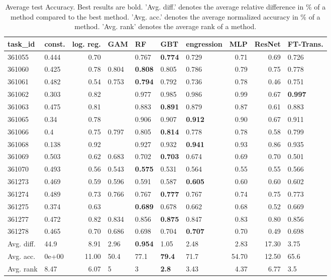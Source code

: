 \begin{table}[ht!]
\centering
\begingroup\footnotesize
\begin{tabular}{llrllllrrl}
  \hline
\hline
task\_id & const. & log. reg. & GAM & RF & GBT & engression & MLP & ResNet & FT-Trans. \\ 
  \hline
361055 & 0.444 & 0.70 &  & 0.767 & \textbf{0.774} & 0.729 & 0.71 & 0.69 & 0.726 \\ 
  361060 & 0.425 & 0.78 & 0.804 & \textbf{0.808} & 0.805 & 0.786 & 0.79 & 0.75 & 0.778 \\ 
  361061 & 0.482 & 0.54 & 0.753 & \textbf{0.794} & 0.792 & 0.736 & 0.78 & 0.46 & 0.751 \\ 
  361062 & 0.303 & 0.82 &  & 0.977 & 0.985 & 0.986 & 0.99 & 0.67 & \textbf{0.997} \\ 
  361063 & 0.475 & 0.81 &  & 0.883 & \textbf{0.891} & 0.879 & 0.87 & 0.61 & 0.883 \\ 
  361065 & 0.34 & 0.78 &  & 0.906 & 0.907 & \textbf{0.912} & 0.90 & 0.67 & 0.911 \\ 
  361066 & 0.4 & 0.75 & 0.797 & 0.805 & \textbf{0.814} & 0.778 & 0.78 & 0.58 & 0.799 \\ 
  361068 & 0.138 & 0.92 &  & 0.927 & 0.932 & \textbf{0.941} & 0.93 & 0.86 & 0.935 \\ 
  361069 & 0.503 & 0.62 & 0.683 & 0.702 & \textbf{0.703} & 0.674 & 0.69 & 0.70 & 0.501 \\ 
  361070 & 0.493 & 0.56 & 0.543 & \textbf{0.575} & 0.531 & 0.564 & 0.55 & 0.55 & 0.566 \\ 
  361273 & 0.469 & 0.59 & 0.596 & 0.591 & 0.587 & \textbf{0.605} & 0.60 & 0.60 & 0.602 \\ 
  361274 & 0.489 & 0.73 & 0.766 & 0.767 & \textbf{0.777} & 0.767 & 0.74 & 0.75 & 0.773 \\ 
  361275 & 0.374 & 0.63 &  & \textbf{0.689} & 0.678 & 0.662 & 0.68 & 0.52 & 0.669 \\ 
  361277 & 0.472 & 0.82 & 0.834 & 0.856 & \textbf{0.875} & 0.847 & 0.83 & 0.80 & 0.856 \\ 
  361278 & 0.465 & 0.70 & 0.686 & 0.698 & 0.704 & \textbf{0.707} & 0.70 & 0.49 & 0.698 \\ 
   \hline
Avg. diff. & 44.9 & 8.91 & 2.96 & \textbf{0.954} & 1.05 & 2.48 & 2.83 & 17.30 & 3.75 \\ 
  Avg. acc. & 0e+00 & 11.00 & 50.4 & 77.1 & \textbf{79.4} & 71.7 & 54.70 & 12.50 & 65.6 \\ 
  Avg. rank & 8.47 & 6.07 & 5 & 3 & \textbf{2.8} & 3.43 & 4.37 & 6.77 & 3.5 \\ 
   \hline
\hline
\end{tabular}
\endgroup
\caption{Average test Accuracy. 
                  Best results are bold. 
                  'Avg. diff.' denotes the average relative difference in \% of a method compared to the best method.
                  'Avg. acc.' denotes the average normalized accuracy in \% of a method.
                  'Avg. rank' denotes the average rank of a method.} 
\label{TABLES/table_results_Accuracy_umap}
\end{table}
